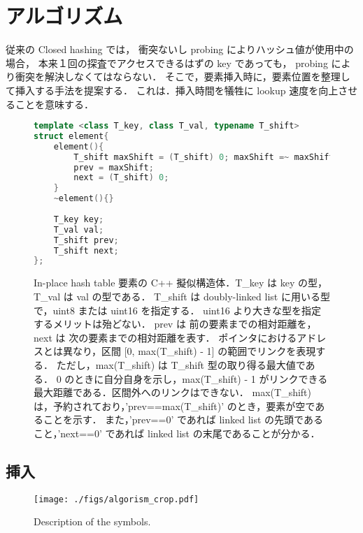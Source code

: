 \chapter{アルゴリズム}
\label{chap_Algorism}

従来の Closed hashing では，
衝突ないし probing によりハッシュ値が使用中の場合，
本来１回の探査でアクセスできるはずの key であっても，
probing により衝突を解決しなくてはならない．
そこで，要素挿入時に，要素位置を整理して挿入する手法を提案する．
これは．挿入時間を犠牲に lookup 速度を向上させることを意味する．



\begin{figure}[h] %
\begin{lstlisting}[language=C++]
template <class T_key, class T_val, typename T_shift>
struct element{
	element(){
		T_shift maxShift = (T_shift) 0; maxShift =~ maxShift;
		prev = maxShift;
		next = (T_shift) 0;
	}
	~element(){}
	
	T_key key;
	T_val val;
	T_shift prev;
	T_shift next;
};
\end{lstlisting}
\caption{
  In-place hash table 要素の C++ 擬似構造体．T\_key は key の型，T\_val は val の型である．
  T\_shift は doubly-linked list に用いる型で，uint8 または uint16 を指定する．
  uint16 より大きな型を指定するメリットは殆どない．
  prev は 前の要素までの相対距離を，next は 次の要素までの相対距離を表す．
  ポインタにおけるアドレスとは異なり，区間 [0, max(T\_shift) - 1] の範囲でリンクを表現する．
  ただし，max(T\_shift) は T\_shift 型の取り得る最大値である．
  0 のときに自分自身を示し，max(T\_shift) - 1 がリンクできる最大距離である．区間外へのリンクはできない．
  max(T\_shift) は，予約されており，'prev==max(T\_shift)' のとき，要素が空であることを示す．
  また，'prev==0' であれば linked list の先頭であること，'next==0' であれば linked list の末尾であることが分かる．
}
\label{fig_IpCHashT_struct}
\end{figure}



\section{挿入}

\begin{figure}[h]
  \texttt{[image: ./figs/algorism\_crop.pdf]}
  \caption{
    Description of the symbols.
  }
  \label{fig_IpCHashT_fig_description}
\end{figure}


